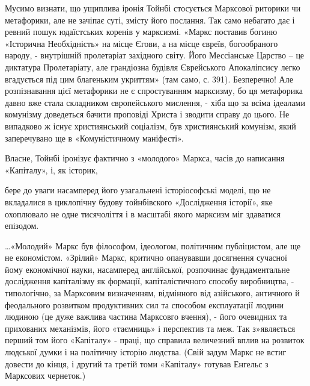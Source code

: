 \documentclass{kapital}
\begin{document}
	Мусимо визнати, що ущиплива іронія Тойнбі стосується Марксової риторики чи метафорики, але не зачіпає суті, змісту його      послання. Так само небагато дає і ревний пошук юдаїстських коренів у марксизмі. «Маркс поставив богиню «Історична Необхідність» на місце Єгови, а на місце євреїв, богообраного народу, - внутрішній пролетаріат західного світу. Його Мессіанське Царство – це диктатура Пролетаріату, але грандіозна будівля Єврейського Апокаліпсису легко вгадується під цим благеньким укриттям» (там само, с. 391). Безперечно! Але розпізнавання цієї метафорики не є спростуванням марксизму, бо ця метафорика давно вже стала складником європейського мислення, - хіба що  за всіма ідеалами комунізму доведеться бачити проповіді Христа і зводити справу до цього. Не випадково ж існує християнський соціалізм, був християнський комунізм, який заперечувано ще в «Комуністичному маніфесті». 	
 
	Власне, Тойнбі іронізує фактично з «молодого» Маркса, часів до написання «Капіталу», і, як історик, 
 
бере до уваги насамперед його узагальнені історіософські моделі, що не вкладалися в циклопічну будову тойнбівского «Дослідження історії», яке  охоплювало не одне тисячоліття і в масштабі якого марксизм міг здаватися епізодом.  
 
…«Молодий» Маркс був філософом, ідеологом, політичним публіцистом, але ще не економістом. «Зрілий» Маркс, критично опанувавши досягнення сучасної йому економічної науки, насамперед англійської, розпочинає фундаментальне дослідження капіталізму як формації, капіталістичного способу виробництва, - типологічно, за Марксовим визначенням,  відмінного від азійського, античного й феодального розвитком продуктивних сил та способом експлуатації людини людиною (це дуже важлива частина Марксовго вчення),  - його очевидних та прихованих механізмів, його «таємниць» і перспектив та меж. Так з»являється перший том його «Капіталу» - праці, що справила величезний вплив на розвиток людської думки і на політичну історію людства. (Свій задум Маркс не встиг довести до кінця, і другий та третій томи «Капіталу» готував Енгельс з Марксових чернеток.)                    
 
\end{document}
